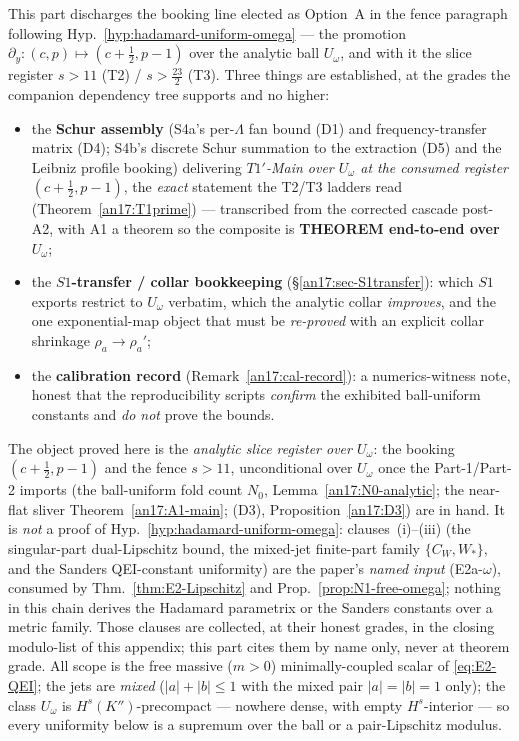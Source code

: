 This part discharges the booking line elected as Option~A in the fence paragraph
following Hyp.~\ref{hyp:hadamard-uniform-omega} --- the promotion
$\partial_y:(c,p)\mapsto(c+\tfrac12,p-1)$ over the analytic ball $U_\omega$, and
with it the slice register $s>11$ (T2) / $s>\tfrac{23}{2}$ (T3). Three things are established, at the grades the
companion dependency tree supports and no higher:
\begin{itemize}
\item[\textbf{A.6}] the \textbf{Schur assembly} (S4a's per-$\Lambda$ fan bound
 (D1) and frequency-transfer matrix (D4); S4b's discrete Schur summation to the
 extraction (D5) and the Leibniz profile booking) delivering
 \emph{$T1'$-Main over $U_\omega$ at the consumed register $(c+\tfrac12,p-1)$},
 the \emph{exact} statement the T2/T3 ladders read
 (Theorem~\ref{an17:T1prime}) --- transcribed from the corrected cascade
 post-A2, with A1 a theorem so the composite is \textbf{THEOREM end-to-end over
 $U_\omega$};
\item[\textbf{A.6}$'$] the \textbf{$S1$-transfer / collar bookkeeping}
 (\S\ref{an17:sec-S1transfer}): which $S1$ exports restrict to $U_\omega$
 verbatim, which the analytic collar \emph{improves}, and the one exponential-map
 object that must be \emph{re-proved} with an explicit collar shrinkage
 $\rho_a\to\rho_a'$;
\item[\textbf{A.6}$''$] the \textbf{calibration record}
 (Remark~\ref{an17:cal-record}): a numerics-witness note, honest that the
 reproducibility scripts \emph{confirm} the exhibited ball-uniform constants and
 \emph{do not} prove the bounds.
\end{itemize}

\begin{remark}
\label{an17:scope-slice}
The object proved here is the \emph{analytic slice register over $U_\omega$}: the
booking $(c+\tfrac12,p-1)$ and the fence $s>11$, unconditional over $U_\omega$
once the Part-1/Part-2 imports (the ball-uniform fold count
$N_0$, Lemma~\ref{an17:N0-analytic}; the near-flat sliver
Theorem~\ref{an17:A1-main}; (D3), Proposition~\ref{an17:D3}) are in hand. It is
\emph{not} a proof of Hyp.~\ref{hyp:hadamard-uniform-omega}: clauses~(i)--(iii)
(the singular-part dual-Lipschitz bound, the mixed-jet finite-part family
$\{C_W,W_*\}$, and the Sanders QEI-constant uniformity) are the paper's
\emph{named input} (E2a-$\omega$), consumed by
Thm.~\ref{thm:E2-Lipschitz} and Prop.~\ref{prop:N1-free-omega}; nothing in this
chain derives the Hadamard parametrix or the Sanders constants over a metric
family. Those clauses are collected, at their honest grades, in the closing
modulo-list of this appendix; this part cites them by name only, never at
theorem grade. All scope is the free massive ($m>0$) minimally-coupled scalar
of \eqref{eq:E2-QEI}; the jets are \emph{mixed} ($|a|+|b|\le1$ with the mixed
pair $|a|=|b|=1$ only); the class $U_\omega$ is $H^s(K'')$-precompact ---
nowhere dense, with empty $H^s$-interior --- so every uniformity below is a
supremum over the ball or a pair-Lipschitz modulus.
\end{remark}

